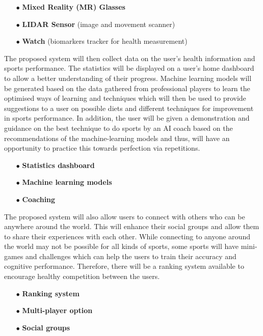 \documentclass[a4paper]{article}
\begin{document}
	\begin{itemize}[itemindent=1em]
		\item[$\bullet$] \textbf{Mixed Reality (MR) Glasses }
		\item[$\bullet$] \textbf{LIDAR Sensor} (image and movement scanner)
		\item[$\bullet$] \textbf{Watch} (biomarkers tracker for health measurement)			
	\end{itemize}\par
	The proposed system will then collect data on the user's health information and sports performance. The statistics will be displayed on a user's home dashboard to allow a better understanding of their progress. Machine learning models will be generated based on the data gathered from professional players to learn the optimised ways of learning and techniques which will then be used to provide suggestions to a user on possible diets and different techniques for improvement in sports performance. In addition, the user will be given a demonstration and guidance on the best technique to do sports by an AI coach based on the recommendations of the machine-learning models and thus, will have an opportunity to practice this towards perfection via repetitions. 
	\begin{itemize}[itemindent=1em]
		\item[$\bullet$] \textbf{Statistics dashboard}
		\item[$\bullet$] \textbf{Machine learning models}
		\item[$\bullet$] \textbf{Coaching}
	\end{itemize}\par
	The proposed system will also allow users to connect with others who can be anywhere around the world. This will enhance their social groups and allow them to share their experiences with each other. While connecting to anyone around the world may not be possible for all kinds of sports, some sports will have mini-games and challenges which can help the users to train their accuracy and cognitive performance.   Therefore, there will be a ranking system available to encourage healthy competition between the users. 
	\begin{itemize}[itemindent=1em]
		\item[$\bullet$] \textbf{Ranking system}
		\item[$\bullet$] \textbf{Multi-player option}
		\item[$\bullet$] \textbf{Social groups}
	\end{itemize}\par
\end{document}
